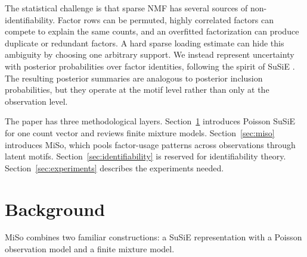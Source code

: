 \documentclass[11pt]{article}
\theoremstyle{plain}
\theoremstyle{definition}
\begin{document}
The statistical challenge is that sparse NMF has several sources of
non-identifiability. Factor rows can be permuted, highly correlated factors can
compete to explain the same counts, and an overfitted factorization can produce
duplicate or redundant factors. A hard sparse loading estimate can hide this
ambiguity by choosing one arbitrary support. We instead represent uncertainty
with posterior probabilities over factor identities, following the spirit of
SuSiE \citep{Wang2020-cr}. The resulting posterior summaries are analogous to
posterior inclusion probabilities, but they operate at the motif level rather
than only at the observation level.

The paper has three methodological layers. Section~\ref{sec:pois-susie}
introduces Poisson SuSiE for one count vector and reviews finite mixture
models. Section~\ref{sec:miso} introduces MiSo, which pools factor-usage
patterns across observations through latent motifs. Section~\ref{sec:identifiability}
is reserved for identifiability theory. Section~\ref{sec:experiments} describes
the experiments needed.

\section{Background}
\label{sec:pois-susie}
MiSo combines two familiar constructions: a SuSiE representation with a
Poisson observation model and a finite mixture model.
\end{document}
